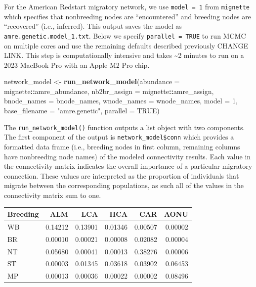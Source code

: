 \documentclass[
]{book}
\newenvironment{Shaded}{\begin{snugshade}}{\end{snugshade}}
\newcommand{\AttributeTok}[1]{\textcolor[rgb]{0.13,0.29,0.53}{#1}}
\newcommand{\ConstantTok}[1]{\textcolor[rgb]{0.56,0.35,0.01}{#1}}
\newcommand{\DecValTok}[1]{\textcolor[rgb]{0.00,0.00,0.81}{#1}}
\newcommand{\FunctionTok}[1]{\textcolor[rgb]{0.13,0.29,0.53}{\textbf{#1}}}
\newcommand{\NormalTok}[1]{#1}
\newcommand{\OtherTok}[1]{\textcolor[rgb]{0.56,0.35,0.01}{#1}}
\newcommand{\SpecialCharTok}[1]{\textcolor[rgb]{0.81,0.36,0.00}{\textbf{#1}}}
\newcommand{\StringTok}[1]{\textcolor[rgb]{0.31,0.60,0.02}{#1}}
\begin{document}
For the American Redstart migratory network, we use \texttt{model\ =\ 1} from \texttt{mignette} which specifies that nonbreeding nodes are ``encountered'' and breeding nodes are ``recovered'' (i.e., inferred). This output saves the model as \texttt{amre.genetic.model\_1.txt}. Below we specify \texttt{parallel\ =\ TRUE} to run MCMC on multiple cores and use the remaining defaults described previously CHANGE LINK. This step is computationally intensive and takes \textasciitilde2 minutes to run on a 2023 MacBook Pro with an Apple M2 Pro chip.

\begin{Shaded}
\begin{Highlighting}[]
\NormalTok{network\_model }\OtherTok{\textless{}{-}} \FunctionTok{run\_network\_model}\NormalTok{(}\AttributeTok{abundance =}\NormalTok{ mignette}\SpecialCharTok{::}\NormalTok{amre\_abundance,}
                        \AttributeTok{nb2br\_assign =}\NormalTok{ mignette}\SpecialCharTok{::}\NormalTok{amre\_assign,}
                        \AttributeTok{bnode\_names =}\NormalTok{ bnode\_names,}
                        \AttributeTok{wnode\_names =}\NormalTok{ wnode\_names,}
                        \AttributeTok{model =} \DecValTok{1}\NormalTok{, }
                        \AttributeTok{base\_filename =} \StringTok{"amre.genetic"}\NormalTok{,}
                        \AttributeTok{parallel =} \ConstantTok{TRUE}\NormalTok{)}
\end{Highlighting}
\end{Shaded}

The \texttt{run\_network\_model()} function outputs a list object with two components. The first component of the output is \texttt{network\_model\$conn} which provides a formatted data frame (i.e., breeding nodes in first column, remaining columns have nonbreeding node names) of the modeled connectivity results. Each value in the connectivity matrix indicates the overall importance of a particular migratory connection. These values are interpreted as the proportion of individuals that migrate between the corresponding populations, as such all of the values in the connectivity matrix sum to one.

\begin{Shaded}
\end{Shaded}

\begin{tabular}{l|r|r|r|r|r}
\hline
Breeding & ALM & LCA & HCA & CAR & AONU\\
\hline
WB & 0.14212 & 0.13901 & 0.01346 & 0.00507 & 0.00002\\
\hline
BR & 0.00010 & 0.00021 & 0.00008 & 0.02082 & 0.00004\\
\hline
NT & 0.05680 & 0.00041 & 0.00013 & 0.38276 & 0.00006\\
\hline
ST & 0.00003 & 0.01345 & 0.03618 & 0.03902 & 0.06453\\
\hline
MP & 0.00013 & 0.00036 & 0.00022 & 0.00002 & 0.08496\\
\hline
\end{tabular}
\end{document}
